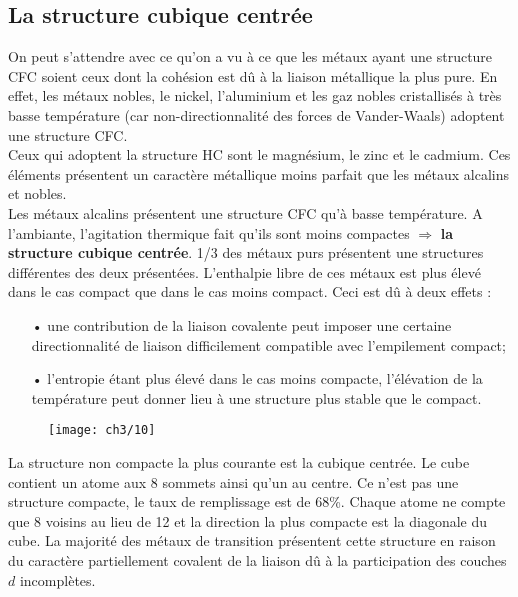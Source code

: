 		\subsection{La structure cubique centrée}
			On peut s'attendre avec ce qu'on a vu à ce que les métaux ayant une structure CFC soient ceux dont la cohésion est dû à la liaison métallique la plus pure. En effet, les métaux nobles, le nickel, l'aluminium et les gaz nobles cristallisés à très basse température (car non-directionnalité des forces de Vander-Waals) adoptent une structure CFC. \\
			Ceux qui adoptent la structure HC sont le magnésium, le zinc et le cadmium. Ces éléments présentent un caractère métallique moins parfait que les métaux alcalins et nobles. 	\\
			Les métaux alcalins présentent une structure CFC qu'à basse température. A l'ambiante, l'agitation thermique fait qu'ils sont moins compactes $\Rightarrow$	\textbf{la structure cubique centrée}. 1/3 des métaux purs présentent une structures différentes des deux présentées. L'enthalpie libre de ces métaux est plus élevé dans le cas compact que dans le cas moins compact. Ceci est dû à  deux effets : 
			\begin{itemize}
				\item[•] une contribution de la liaison covalente peut imposer une certaine directionnalité de liaison difficilement compatible avec l'empilement compact;
				\item[•] l'entropie étant plus élevé dans le cas moins compacte, l'élévation de la température peut donner lieu à une structure plus stable que le compact. 
\end{itemize}		
			
			\begin{wrapfigure}[4]{l}{4cm}
			\texttt{[image: ch3/10]}
			\end{wrapfigure}
			La structure non compacte la plus courante est la cubique centrée. Le cube contient un atome aux 8 sommets ainsi qu'un au centre. Ce n'est pas une structure compacte, le taux de remplissage est de 68\%. Chaque atome ne compte que 8 voisins au lieu de 12 et la direction la plus compacte est la diagonale du cube. La majorité des métaux de transition présentent cette structure en raison du caractère partiellement covalent de la liaison dû à la participation des couches $d$ incomplètes. 
			
